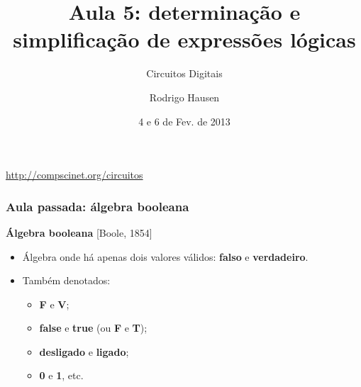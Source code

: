 \documentclass{beamer}
\title{Aula 5: determinação e simplificação de expressões lógicas}
\subtitle{Circuitos Digitais}
\author{Rodrigo Hausen}
\institute{CMCC -- UFABC}
\date{4 e 6 de Fev. de 2013}
\begin{document}
\begin{frame}
\maketitle

\vspace{-1cm}

\begin{center}
\url{http://compscinet.org/circuitos}
\end{center}

\end{frame}


\begin{frame}
 \frametitle{Aula passada: álgebra booleana}

 \textbf{Álgebra booleana} [Boole, 1854]
 \begin{itemize}
 \item Álgebra onde há apenas dois valores válidos: \textbf{falso} e
\textbf{verdadeiro}.
 \item Também denotados:
 \begin{itemize}
   \item \textbf{F} e \textbf{V};
   \item \textbf{false} e \textbf{true} (ou \textbf{F} e \textbf{T});
   \item \textbf{desligado} e \textbf{ligado};
   \item \textbf{0} e \textbf{1}, etc.
 \end{itemize}
 \end{itemize}

\end{frame}

\end{document}
